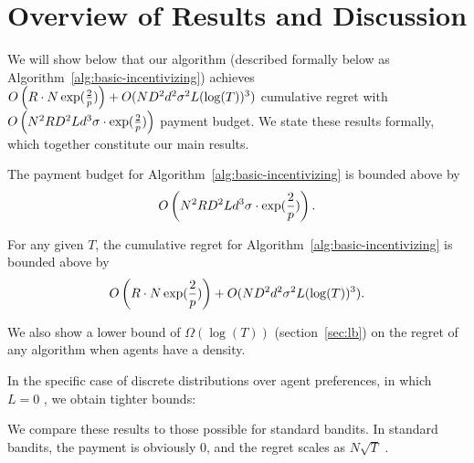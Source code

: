 \section{Overview of Results and Discussion}


%
%

We will show below that our algorithm (described formally below as Algorithm~\ref{alg:basic-incentivizing}) achieves $O \left(R\cdot  N\exp(\frac{2}{p})\right) + O(ND^2 d^2\sigma^2 L(\log(T))^3)$ cumulative regret with $O \left(N^2 R D^2 L d^3 \sigma\cdot \exp(\frac{2}{p}) \right)$ payment budget.  We state these results formally, which together constitute our main results.

\begin{theorem}
The payment budget for Algorithm~\ref{alg:basic-incentivizing} is bounded above by 
\begin{align}
O \left(N^2 R D^2 L d^3 \sigma\cdot \exp(\frac{2}{p}) \right). \nonumber 
\end{align} 
\label{rst:budget}
\end{theorem}

\begin{theorem}
For any given $T$, the cumulative regret for Algorithm~\ref{alg:basic-incentivizing}
is bounded above by 
\begin{align}
O \left(R\cdot  N\exp(\frac{2}{p})\right) +
O(ND^2 d^2\sigma^2 L(\log(T))^3).
\end{align}
\label{rst:regret}
\end{theorem}

We also show a lower bound of $\Omega(\log(T))$ (section~\ref{sec:lb}) on the regret of any algorithm when agents have a density. 

In the specific case of discrete distributions over agent preferences, in which $L=0$ , we obtain tighter bounds:


We compare these results to those possible for standard bandits. In standard bandits, the payment is obviously $0$, and the regret scales as $N \sqrt{T}$ .

